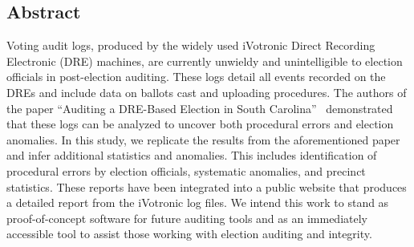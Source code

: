 
\subsection*{Abstract}
Voting audit logs, produced by the widely used iVotronic Direct Recording Electronic (DRE) machines, are currently unwieldy and unintelligible to election officials in post-election auditing. These logs detail all events recorded on the DREs and include data on ballots cast and uploading procedures. The authors of the paper \textquotedblleft Auditing a DRE-Based Election in South Carolina\textquotedblright~\cite{Buell2011} demonstrated that these logs can be analyzed to uncover both procedural errors and  election anomalies.  In this study, we replicate the results from the aforementioned paper and infer additional statistics and anomalies. This includes identification of procedural errors by election officials, systematic anomalies, and precinct statistics. These reports have been integrated into a public website that produces a detailed report from the iVotronic log files.  We intend this work to stand as proof-of-concept software for future auditing tools and as an immediately accessible tool to assist those working with election auditing and integrity.
